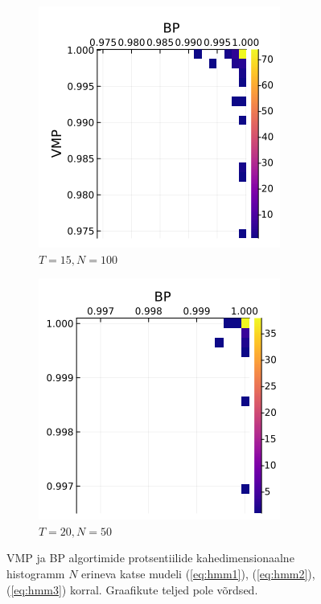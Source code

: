 \begin{figure}
\centering
\begin{subfigure}{.5\textwidth}
  \centering
  \includegraphics[width=1\linewidth]{uniform_dirichlet_percs_std125_t15.png}
  \caption{ $T = 15, N = 100$ }
  \label{fig:sub1}
\end{subfigure}%
\begin{subfigure}{.5\textwidth}
  \centering
  \includegraphics[width=1\linewidth]{uniform_dirichlet_percs_std125_t20.png}
  \caption{$T = 20, N = 50$}
  \label{fig:sub2}
\end{subfigure}
\caption{VMP ja BP algortimide protsentiilide kahedimensionaalne histogramm $N$ erineva katse mudeli (\ref{eq:hmm1}), (\ref{eq:hmm2}), (\ref{eq:hmm3}) korral. Graafikute teljed pole võrdsed.}
\label{fig:test}
\end{figure}


